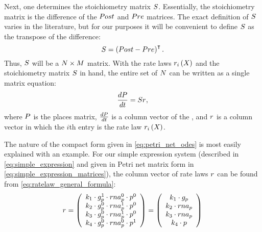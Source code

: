 Next, one determines the stoichiometry matrix $S$. Essentially, the stoichiometry matrix is the difference of the $Post$ and $Pre$ matrices. The exact definition of $S$ varies in the literature, but for our purposes it will be convenient to define $S$ as the transpose of the difference:
\begin{equation*}\label{eq:s_definition}
    S = \left( Post - Pre \right)^{\intercal}.
\end{equation*}
Thus, $S$ will be a $N \times M$ matrix. With the rate laws $r_{i} \left( X_{} \right)$ and the stoichiometry matrix $S$ in hand, the entire set of $N$  can be written as a single matrix equation:
\begin{equation}\label{eq:petri_net_odes}
    \frac{dP}{dt} = S r_{},
\end{equation}
where $P$ is the places matrix, $\frac{dP}{dt}$ is a column vector of the , and $r_{}$ is a column vector in which the $i$th entry is the rate law $r_{i} \left( X_{} \right)$. 

The nature of the compact form given in \eqref{eq:petri_net_odes} is most easily explained with an example. For our simple expression system (described in \eqref{eq:simple_expression} and given in Petri net matrix form in \eqref{eq:simple_expression_matrices}), the column vector of rate laws $r_{}$ can be found from \eqref{eq:ratelaw_general_formula}:
\begin{gather*}
    \rlawmat = 
%
    \left( \begin{array}{c}
        \condetx{1} \cdot \con{g_p}^{1} \cdot \con{rna_p}^{0} \cdot \con{p}^{0} \\
        \condetx{2} \cdot \con{g_p}^{0} \cdot \con{rna_p}^{1} \cdot \con{p}^{0} \\
        \condetx{3} \cdot \con{g_p}^{0} \cdot \con{rna_p}^{1} \cdot \con{p}^{0} \\
        \condetx{4} \cdot \con{g_p}^{0} \cdot \con{rna_p}^{0} \cdot \con{p}^{1}
    \end{array} \right) =
%
    \left( \begin{array}{c}
        \condetx{1} \cdot \con{g_p} \\
        \condetx{2} \cdot \con{rna_p} \\
        \condetx{3} \cdot \con{rna_p} \\
        \condetx{4} \cdot \con{p}
    \end{array} \right)
\end{gather*}

